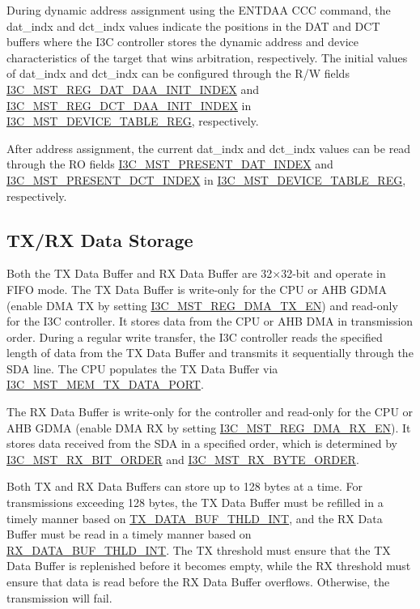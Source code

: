\documentclass[main\_\_EN.tex]{subfiles}
\begin{document}
During dynamic address assignment using the ENTDAA CCC command, the dat\_indx and dct\_indx values indicate the positions in the DAT and DCT buffers where the I3C controller stores the dynamic address and device characteristics of the target that wins arbitration, respectively. The initial values of dat\_indx and dct\_indx can be configured through the R/W fields \hyperref[fielddesc:I3CMSTREGDATDAAINITINDEX]{I3C\_MST\_REG\_DAT\_DAA\_INIT\_INDEX} and \hyperref[fielddesc:I3CMSTREGDCTDAAINITINDEX]{I3C\_MST\_REG\_DCT\_DAA\_INIT\_INDEX} in \hyperref[regdesc:I3CMSTDEVICETABLEREG]{I3C\_MST\_DEVICE\_TABLE\_REG}, respectively.

After address assignment, the current dat\_indx and dct\_indx values can be read through the RO fields \hyperref[fielddesc:I3CMSTPRESENTDATINDEX]{I3C\_MST\_PRESENT\_DAT\_INDEX} and \hyperref[fielddesc:I3CMSTPRESENTDCTINDEX]{I3C\_MST\_PRESENT\_DCT\_INDEX} in \hyperref[regdesc:I3CMSTDEVICETABLEREG]{I3C\_MST\_DEVICE\_TABLE\_REG}, respectively.

\subsection{TX/RX Data Storage}

Both the TX Data Buffer and RX Data Buffer are 32×32-bit and operate in FIFO mode. The TX Data Buffer is write-only for the CPU or AHB GDMA (enable DMA TX by setting \hyperref[fielddesc:I3CMSTREGDMATXEN]{I3C\_MST\_REG\_DMA\_TX\_EN}) and read-only for the I3C controller. It stores data from the CPU or AHB DMA in transmission order. During a regular write transfer, the I3C controller reads the specified length of data from the TX Data Buffer and transmits it sequentially through the SDA line. The CPU populates the TX Data Buffer via \hyperref[fielddesc:I3CMSTMEMTXDATAPORT]{I3C\_MST\_MEM\_TX\_DATA\_PORT}.

The RX Data Buffer is write-only for the controller and read-only for the CPU or AHB GDMA (enable DMA RX by setting \hyperref[fielddesc:I3CMSTREGDMARXEN]{I3C\_MST\_REG\_DMA\_RX\_EN}). It stores data received from the SDA in a specified order, which is determined by \hyperref[fielddesc:I3CMSTREGRXBITORDER]{I3C\_MST\_RX\_BIT\_ORDER} and \hyperref[fielddesc:I3CMSTREGRXBYTEORDER]{I3C\_MST\_RX\_BYTE\_ORDER}.

Both TX and RX Data Buffers can store up to 128 bytes at a time. For transmissions exceeding 128 bytes, the TX Data Buffer must be refilled in a timely manner based on \hyperref[int:TXDATABUFTHLDINT]{TX\_DATA\_BUF\_THLD\_INT}, and the RX Data Buffer must be read in a timely manner based on \hyperref[int:RXDATABUFTHLDINT]{RX\_DATA\_BUF\_THLD\_INT}. The TX threshold must ensure that the TX Data Buffer is replenished before it becomes empty, while the RX threshold must ensure that data is read before the RX Data Buffer overflows. Otherwise, the transmission will fail.
\end{document}
